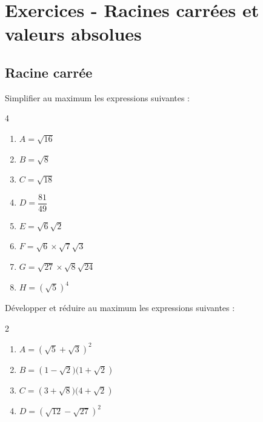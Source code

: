\bigskip

\newpage

\section*{Exercices - Racines carrées et valeurs absolues}
{\setlength{\columnseprule}{0pt}
\setcounter{NumEx}{1}


\subsection*{Racine carrée}
\begin{Exercice}
Simplifier au maximum les expressions suivantes :
\vspace{-0.5cm}
\begin{multicols}{4}
\begin{enumerate}
    \item $A = \sqrt{16}$
    \item $B = \sqrt{8}$
    \item $C = \sqrt{18}$
    \item $D = \dfrac{81}{49}$
    \item $E = \sqrt{6} \sqrt{2}$
    \item $F = \sqrt{6} \times \sqrt{7} \sqrt{3}$
    \item $G = \sqrt{27} \times \sqrt{8} \sqrt{24}$
    \item $H = (\sqrt{5})^4$
\end{enumerate}
\end{multicols}
\end{Exercice}

\begin{Exercice}
Développer et réduire au maximum les expressions suivantes :
\vspace{-0.5cm}
\begin{multicols}{2}
\begin{enumerate}
    \item $A = \left( \sqrt{5} + \sqrt{3} \right)  ^2$
    \item $B = \left( 1 - \sqrt{2})(1 + \sqrt{2} \right) $
    \item $C = \left( 3 + \sqrt{8})(4 + \sqrt{2} \right) $
    \item $D = \left( \sqrt{12} - \sqrt{27} \right) ^2$
\end{enumerate}
\end{multicols}
\end{Exercice}

}
